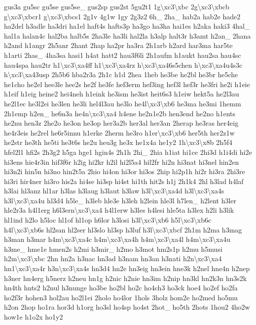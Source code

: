 {gus3a gu5sc gu5se gus5se\-\_\- gus2sp gus2st 5gu2t1 1g\textbackslash{}xc3\textbackslash{}xbc 2g\textbackslash{}xc3\textbackslash{}xbcb g\textbackslash{}xc3\textbackslash{}xbcr1 g\textbackslash{}xc3\textbackslash{}xbcs1 2g1v 4g1w 1gy 2g3z2 6h\-\_\- 2ha\-\_\- hab2a hab2e hade2 ha2del h3adle ha3dri ha1el haft4s hafts3p ha3go ha3ha hai1es h2aka haki3 4hal\-\_\- hal1a halan4c hal2ba halb5s 2ha3le ha3li hal2la h3alp halt3r h3amt h2an\-\_\- 2hana h2and h1angr 2h5anr 2hant 2hap ha2pr ha3ra 2h1arb h2ard har3ma har5te h1arti 2has\-\_\- 4ha3sa hasi1 h4at hatt2 hau3f6li 2h1aufm h1aukt hau2sa hau4sc hau4spa hau2tr h1\textbackslash{}xc3\textbackslash{}xa4ff h1\textbackslash{}xc3\textbackslash{}xa4rz h\textbackslash{}xc3\textbackslash{}xa46s5chen h\textbackslash{}xc3\textbackslash{}xa4u4s3c h\textbackslash{}xc3\textbackslash{}xa43usp 2h5b6 hba2r3a 2h1c h1d 2hea 1heb he3be he2bl he3br he5che he1cho he2el hee3le hee2s he2f he3fe hef3erm hef3ing hef3l hef3r he3fri he2i h1eie h1eif h1eig heine2 hei4neh h1eink he3ism he3ist heit6s3 h1eiw hekt5a he2l3au he2l1ec he3l2ei he3len he3li hel4l3au he3lo he4l\textbackslash{}xc3\textbackslash{}xb6 he3ma he3mi 1hemm 2h1emp h2en\-\_\- he6n3a he4n\textbackslash{}xc3\textbackslash{}xa4 h4ene he2n1e2b hen3end he2no h1ents he2nu hen3z 2he2o he3on he3op her3a2b her3al her3an 2herap he3ras her4eig he4r3eis he2rel he6r5innu h1erke 2herm he3ro h1er\textbackslash{}xc3\textbackslash{}xb6 her5th her2z1w he2str he3th he5ti he3t6s he2u heu3g he3x he1x4a he1y2 1h\textbackslash{}xc3\textbackslash{}x8b 2h5f4 hfel2l1 hfi2s 2h3g2 h5ga hge1 hgin4s 2h1h 2hi\-\_\- 2hia h1iat hi1ce 2hi3d h1i4di hi2e hi3ens hie4r3in hif3f6r h2ig hi2kr h2il hi2l5a4 hil2fr hi2n hi3nat hi3nel hin2en hi3n2i hin5n hi3no hin2t5a 2hio hi4on hi3or hi3os 2hip hi2p1h hi2r hi3ra 2hi3re hi3ri hir4ner hi3ro his2a hi4se hi3sp hi4st hi1th hit2s h1j 2h1k4 2hl h3lad h4laf h3lai hl3anz hl1ar h3las h3laug h3laut h3law h3l\textbackslash{}xc3\textbackslash{}xa4d h3l\textbackslash{}xc3\textbackslash{}xa4s h3l\textbackslash{}xc3\textbackslash{}xa4u hl3d4 h5le\-\_\- h3leb hle3e h3leh h2lein hle3l h7len\-\_\- h2lent h3ler hle2r3a h4l1erg h6l3ern\textbackslash{}xc3\textbackslash{}xa4 h4l1erw h3les h4lesi hle5ta h3lex h2li h3lik hl1ind h2lo h5loc hl1of hl1op h6lor h3losi h3l\textbackslash{}xc3\textbackslash{}xb6 h5l\textbackslash{}xc3\textbackslash{}xb6c h4l\textbackslash{}xc3\textbackslash{}xb6s hl2san hl2ser hl3slo hl3sp h3luf h3l\textbackslash{}xc3\textbackslash{}xbcf 2h1m h2ma h3mag h3man h3mar h4m\textbackslash{}xc3\textbackslash{}xa4c h4m\textbackslash{}xc3\textbackslash{}xa4h h4m\textbackslash{}xc3\textbackslash{}xa4l h4m\textbackslash{}xc3\textbackslash{}xa4u h3me\-\_\- hme1e hmen2s h2mi h3mir\-\_\- h2mo h3mot hm2s1p h2mu h5musi h2m\textbackslash{}xc3\textbackslash{}xbc 2hn hn2a h3nac hn3ad h3nam hn3an h3nati h2n\textbackslash{}xc3\textbackslash{}xa4 hn1\textbackslash{}xc3\textbackslash{}xa4r h3n\textbackslash{}xc3\textbackslash{}xa4s hn3d4 hn2e hn3eig hn3ein hne3k h2nel hne4n h2nep h3ner hn4erg h5nerz h2neu hn1g h2nic h2nie hn3im h2nip hn3kl hn2k3n hn3s2k hn4th hnts2 h2nul h3nunge ho3be ho2bl ho2c ho4ch3 ho3ck hoe4 ho2ef ho2fa ho2f3r hohen3 hol2au ho2l1ei 2holo ho4lor 1hols 3holz hom2e ho2med ho5mu h2on 2hop ho1ra hor3d h1org ho3sl ho4sp ho4st 2hot\-\_\- ho5th 2hots 1hou2 4ho2w how1e h1o2x ho1y2 }
